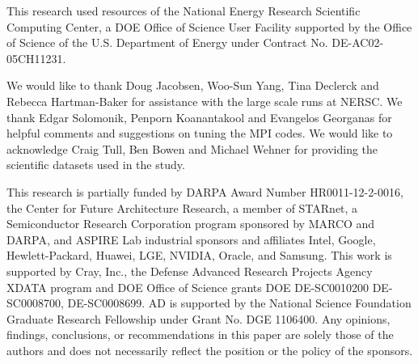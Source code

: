 This research used resources of the National Energy Research Scientific Computing Center, a DOE Office of Science User Facility supported by the Office of Science of the U.S. Department of Energy under Contract No. DE-AC02-05CH11231. 

We would like to thank Doug Jacobsen, Woo-Sun Yang, Tina Declerck and Rebecca Hartman-Baker for assistance with the large scale runs at NERSC. We thank Edgar Solomonik, Penporn Koanantakool and Evangelos Georganas for helpful comments and suggestions on tuning the MPI codes. We would like to acknowledge Craig Tull, Ben Bowen and Michael Wehner for providing the scientific datasets used in the study. 

This research is partially funded by DARPA Award Number HR0011-12-2-0016, the Center for Future Architecture Research, a member of STARnet, a Semiconductor Research Corporation program sponsored by MARCO and DARPA, and ASPIRE Lab industrial sponsors and affiliates Intel, Google, Hewlett-Packard, Huawei, LGE, NVIDIA, Oracle, and Samsung.  This work is supported by Cray, Inc., the Defense Advanced Research Projects Agency XDATA program and DOE Office of Science grants DOE DE-SC0010200 DE-SC0008700, DE-SC0008699. AD is supported by the National Science Foundation Graduate Research Fellowship under Grant No. DGE 1106400. Any opinions, findings, conclusions, or recommendations in this paper are solely those of the authors and does not necessarily reflect the position or the policy of the sponsors.